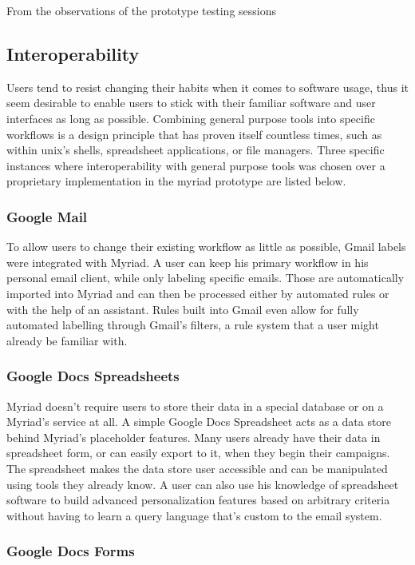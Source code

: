 From the observations of the prototype testing sessions

\subsection{Interoperability}

Users tend to resist changing their habits when it comes to software usage, thus it seem desirable to enable users to stick with their familiar software and user interfaces as long as possible. Combining general purpose tools into specific workflows is a design principle that has proven itself countless times, such as within unix’s shells, spreadsheet applications, or file managers.
Three specific instances where interoperability with general purpose tools was chosen over a proprietary implementation in the myriad prototype are listed below.

\subsubsection{Google Mail}

To allow users to change their existing workflow as little as possible, Gmail labels were integrated with Myriad. A user can keep his primary workflow in his personal email client, while only labeling specific emails. Those are automatically imported into Myriad and can then be processed either by automated rules or with the help of an assistant. Rules built into Gmail even allow for fully automated labelling through Gmail’s filters, a rule system that a user might already be familiar with.

\subsubsection{Google Docs Spreadsheets}

Myriad doesn't require users to store their data in a special database or on a Myriad's service at all. A simple Google Docs Spreadsheet acts as a data store behind Myriad's placeholder features. Many users already have their data in spreadsheet form, or can easily export to it, when they begin their campaigns. The spreadsheet makes the data store user accessible and can be manipulated using tools they already know. A user can also use his knowledge of spreadsheet software to build advanced personalization features based on arbitrary criteria without having to learn a query language that's custom to the email system.

\subsubsection{Google Docs Forms}

